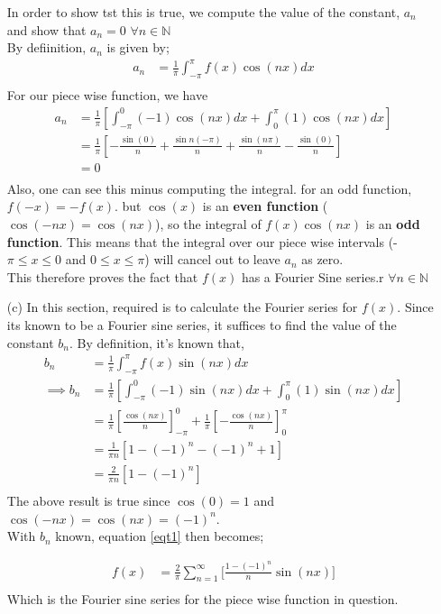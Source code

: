 \documentclass[12pt,a4paper]{article}
\newcommand{\N}{\mathbb{N}}
\begin{document}
\begin{enumerate}
In order to show tst this is true, we compute the value of the constant, $a_n$ and show that $a_n=0$ $\forall n\in \N$\\By defiinition, $a_n$ is given by;
\begin{align}\label{eqtn2}
a_n &= \frac{1}{\pi} \int_{-\pi}^{\pi} f(x) \cos (nx) dx\\
\nonumber
\end{align}
For our piece wise function, we have
\begin{align*}
a_n&= \frac{1}{\pi} \left[ \int_{-\pi}^{0} (-1) \cos (nx) dx + \int_{0}^{\pi} (1) \cos (nx) dx\right]\\
\nonumber
&= \frac{1}{\pi} \left[-\frac{\sin (0)}{n} + \frac{\sin n(-\pi)}{n} +\frac{\sin (n\pi)}{n}-\frac{\sin (0)}{n}\right]\\
\nonumber
&= 0\\
\nonumber
\end{align*}
Also, one can see this minus computing the integral. for an odd function, $f(-x) = -f(x)$. but $\cos(x)$ is an \textbf{even function} ($\cos (-nx) = \cos(nx)$), so the integral of $f(x)\cos(nx)$ is an \textbf{odd function}. This means that the integral over our piece wise intervals (-$\pi\le x \le 0$ and $0\le x \le \pi$) will cancel out to leave $a_n$ as zero.\\
This therefore proves the fact that $f(x)$ has a Fourier Sine series.r $\forall n\in \N$

\item[(c)]
    In this section, required is to calculate the Fourier series for $f(x)$. Since its known to be a Fourier sine series, it suffices to find the value of the constant $b_n$. By definition, it's known that,
\begin{align*}
b_n &= \frac{1}{\pi} \int_{-\pi}^{\pi} f(x) \sin (nx) dx\\
\nonumber
\implies b_n&= \frac{1}{\pi} \left[ \int_{-\pi}^{0} (-1) \sin (nx) dx + \int_{0}^{\pi} (1) \sin (nx) dx\right]\\
\nonumber
&= \frac{1}{\pi} \left[\frac{\cos (nx)}{n}\right]_{-\pi}^{0} + \frac{1}{\pi} \left[-\frac{\cos (nx)}{n}\right]_{0}^{\pi}\\
&= \frac{1}{\pi n} \left[ 1-(-1)^{n}-(-1)^{n}+1\right]\\
\nonumber
&= \frac{2}{\pi n} \left[ 1-(-1)^{n}\right]\\
\nonumber
\end{align*}
The above result is true since $\cos(0)=1$ and $\cos(-nx)=\cos(nx)= (-1)^n$.\\
With $b_n$ known, equation \eqref{eqt1} then becomes;

\begin{align*}
f(x) &= \frac{2}{\pi} \sum_{n=1}^{\infty} \bigg[\frac{1-(-1)^{n}}{n} \sin (nx)\bigg] \\
\nonumber
\end{align*}
Which is the Fourier sine series for the piece wise function in question.
\end{enumerate}
\end{document}
